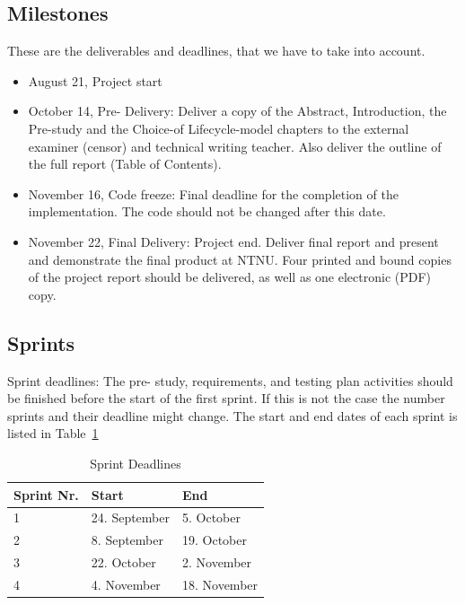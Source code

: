 \subsection {Milestones}
These are the deliverables and deadlines, that we have to take into account.
\begin {itemize}

\item August 21, Project start

\item October 14, Pre- Delivery: Deliver a copy of the Abstract, Introduction, the Pre-study and the Choice-of Lifecycle-model chapters to the external examiner (censor) and technical writing teacher. Also deliver the outline of the full report (Table of  Contents).

\item November 16, Code freeze: Final deadline for the completion of the implementation. The code should not be changed after this date.

\item November 22, Final Delivery: Project end. Deliver final report and present and demonstrate the final product at NTNU. Four printed and bound copies of  the project report should be delivered, as well as one electronic (PDF) copy.

\end {itemize}

\subsection {Sprints}
Sprint deadlines:
The pre- study, requirements, and testing plan activities should be finished before the start of the first sprint. If this is not the case the number sprints and their deadline might change. The start and end dates of each sprint is listed in Table~\ref{table:sprintdeadlines}

\begin{table}
\caption{Sprint Deadlines}
\centering
\begin{tabular}{ l l l }
\hline
Sprint Nr.		&Start		&End		\\
\hline
1		&24. September		&5. October		\\
2		&8. September			&19. October		\\
3		&22. October			&2. November		\\
4		&4. November			&18. November	\\
\hline
\end{tabular}
\label{table:sprintdeadlines}
\end{table}

